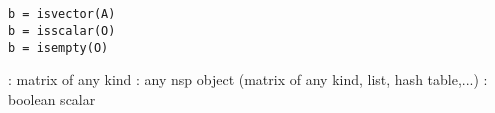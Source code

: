 
\begin{mandesc}
   \\
   \\
\end{mandesc}
\begin{calling_sequence}
\begin{verbatim}
b = isvector(A)
b = isscalar(O)
b = isempty(O)
\end{verbatim}
\end{calling_sequence}

\begin{parameters}
  \begin{varlist}
    : matrix of any kind
    : any nsp object (matrix of any kind, list, hash table,...)
    :  boolean scalar
  \end{varlist}
\end{parameters}

